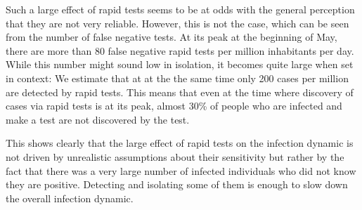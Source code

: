 Such a large effect of rapid tests seems to be at odds with the general perception that
they are not very reliable. However, this is not the case, which can be seen from the
number of
false negative tests. At its peak at the beginning of May, there are more than 80 false
negative rapid tests per million inhabitants per day. While this number might sound low
in isolation, it becomes quite large when set in context: We estimate that at at the
the same time only 200 cases per million are detected by rapid tests. This means that
even at the time where discovery of cases via rapid tests is at its peak, almost
30\% of people who are infected and make a test are not discovered by the test.

This shows clearly that the large effect of rapid tests on the infection dynamic
is not driven by unrealistic assumptions about their sensitivity but rather by the
fact that there was a very large number of infected individuals who did not know they
are positive. Detecting and isolating some of them is enough to slow down the
overall infection dynamic.

